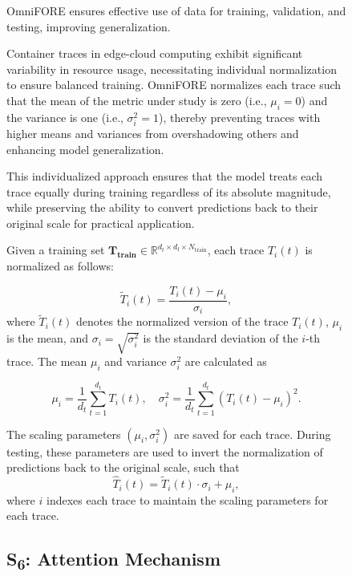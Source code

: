 \begin{figure}[!htbp]
{\ac{OmniFORE} ensures effective use of data for training, validation, and testing, improving generalization.

Container traces in edge-cloud computing exhibit significant variability in resource usage, necessitating individual normalization to ensure balanced training. \ac{OmniFORE} normalizes each trace such that the mean of the metric under study is zero (i.e., $\mu_i=0$) and the variance is one (i.e., $\sigma_i^2=1$), thereby preventing traces with higher means and variances from overshadowing others and enhancing model generalization.

This individualized approach ensures that the model treats each trace equally during training regardless of its absolute magnitude, while preserving the ability to convert predictions back to their original scale for practical application.

Given a training set $\mathbf{T_{\text{train}}} \in \mathbb{R}^{d_t \times d_{\text{f}} \times N_{\text{train}}}$, each trace $T_i(t)$ is normalized as follows:

\begin{equation}
\tilde{T}_i(t) = \frac{T_i(t) - \mu_i}{\sigma_i},  
\end{equation}
where $\tilde{T}_i(t)$ denotes the normalized version of the trace $T_i(t)$, \(\mu_i\) is the mean, and \(\sigma_i = \sqrt{\sigma_i^2}\) is the standard deviation of the \(i\)-th trace. The mean \(\mu_i\) and variance \(\sigma_i^2\) are calculated as

\begin{equation}
\mu_i = \frac{1}{d_t} \sum_{t=1}^{d_t} T_i(t), \quad \sigma_i^2 = \frac{1}{d_t} \sum_{t=1}^{d_t} (T_i(t) - \mu_i)^2.
\end{equation}

The scaling parameters $(\mu_i, \sigma_i^2)$ are saved for each trace. During testing, these parameters are used to invert the normalization of predictions back to the original scale, such that
\begin{equation}
\hat{T}_i(t) = \tilde{T}_i(t) \cdot \sigma_i + \mu_i,
\end{equation}
where $i$ indexes each trace to maintain the scaling parameters for each trace.

\subsection{\texorpdfstring{S\textsubscript{6}: Attention Mechanism}{S6: Attention Mechanism}}
\label{sec:ch4_attention_mechanism}

}
\end{figure}
